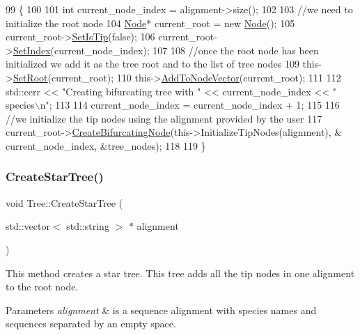 \begin{DoxyCode}
99                                                                \{
100   
101   \textcolor{keywordtype}{int} current\_node\_index = alignment->size();
102   
103   \textcolor{comment}{//we need to initialize the root node}
104   \hyperlink{classNode}{Node}* current\_root = \textcolor{keyword}{new} \hyperlink{classNode}{Node}();
105   current\_root->\hyperlink{classNode_a89bff92e3930d521439395ccf332418f}{SetIsTip}(\textcolor{keyword}{false});
106   current\_root->\hyperlink{classNode_a6f2acc7b954108a6fe266838fce50ef6}{SetIndex}(current\_node\_index);
107   
108   \textcolor{comment}{//once the root node has been initialized we add it as the tree root and to the list of tree nodes}
109   this->\hyperlink{classTree_ae592faa2c1f2da3cc1157bd9a4b884b5}{SetRoot}(current\_root);
110   this->\hyperlink{classTree_aba172068387b9b5be1a6750a30e8199a}{AddToNodeVector}(current\_root);
111   
112   std::cerr << \textcolor{stringliteral}{"Creating bifurcating tree with "} << current\_node\_index << \textcolor{stringliteral}{" species\(\backslash\)n"};
113 
114   current\_node\_index = current\_node\_index + 1;
115   
116   \textcolor{comment}{//we initialize the tip nodes using the alignment provided by the user}
117   current\_root->\hyperlink{classNode_a188e5d00d54887dc3490837f2f025abf}{CreateBifurcatingNode}(this->InitializeTipNodes(alignment), &
      current\_node\_index, &tree\_nodes);
118   
119 \}
\end{DoxyCode}
\mbox{\label{classTree_ac446f0f8211fcc033502690a9a164e95}} 
\subsubsection{\texorpdfstring{Create\+Star\+Tree()}{CreateStarTree()}}
{\footnotesize\ttfamily void Tree\+::\+Create\+Star\+Tree (\begin{DoxyParamCaption}\item[{std\+::vector$<$ std\+::string $>$ $\ast$}]{alignment }\end{DoxyParamCaption})}

This method creates a star tree. This tree adds all the tip nodes in one alignment to the root node.


\begin{DoxyParams}{Parameters}
{\em alignment} & is a sequence alignment with species names and sequences separated by an empty space. \\
\hline
\end{DoxyParams}


